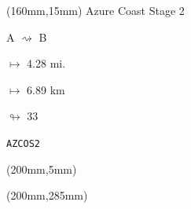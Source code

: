 \begin{textblock*}{40mm}(160mm,15mm)%
Azure Coast Stage 2
\par A $\rightsquigarrow$ B
\Large
\par$\mapsto$ 4.28 mi.
\par$\mapsto$ 6.89 km
\par$\looparrowright$ 33
\par\hfill\tiny\tt AZCOS2\\
\end{textblock*}
\begin{textblock*}{20mm}(200mm,5mm)%
\fbox{\thepage}
\end{textblock*}
\begin{textblock*}{20mm}(200mm,285mm)%
\fbox{\thepage}
\end{textblock*}
\null\newpage

